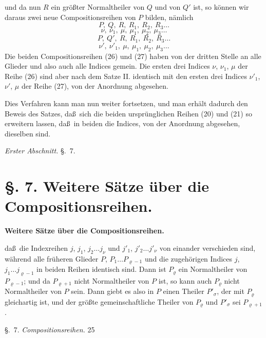 \documentclass[12pt,a4paper]{book}
\begin{document}
\vspace{0.3cm}

und da nun $R$ ein gr\"o\ss ter Normaltheiler von $Q$ und von $Q'$ ist, so k\"onnen wir daraus zwei neue Compositionsreihen von $P$ bilden, n\"amlich
\[P,\ Q,\ R,\ R_1,\ R_2,\ R_3 \ldots\]
\[\nu,\ \nu_1,\ \mu,\ \mu_1,\ \mu_2,\ \mu_3 \ldots\]
\[P,\ Q',\ R,\ R_1,\ R_2,\ R_3 \ldots\]
\[\nu',\ \nu'_1,\ \mu,\ \mu_1,\ \mu_2,\ \mu_3 \ldots\]
Die beiden Compositionsreihen (26) und (27) haben von der dritten Stelle an alle Glieder und also auch alle Indices gemein. Die ersten drei Indices $\nu$, $\nu_1$, $\mu$ der Reihe (26) sind aber nach dem Satze II. identisch mit den ersten drei Indices $\nu'_1$, $\nu'$, $\mu$ der Reihe (27), von der Anordnung abgesehen.

Dies Verfahren kann man nun weiter fortsetzen, und man erh\"alt dadurch den Beweis des Satzes, da\ss\ sich die beiden urspr\"unglichen Reihen (20) und (21) so erweitern lassen, da\ss\ in beiden die Indices, von der Anordnung abgesehen, dieselben sind.

\newpage
{} \hfill \textit{Erster Abschnitt.} \hfill \S.~7.

\vspace{0.3cm}

\section*{\S. 7. Weitere S\"atze \"uber die Compositionsreihen.}

\begin{center}
\textbf{Weitere S\"atze \"uber die Compositionsreihen.}
\end{center}

da\ss\ die Indexreihen $j$, $j_1$, $j_2 \ldots j_\nu$ und $j'_1$, $j'_2 \ldots j'_\nu$ von einander verschieden sind, w\"ahrend alle fr\"uheren Glieder $P$, $P_1 \ldots P_{\varrho-1}$ und die zugeh\"origen Indices $j$, $j_1 \ldots j_{\varrho-1}$ in beiden Reihen identisch sind. Dann ist $P_\varrho$ ein Normaltheiler von $P_{\varrho-1}$; und da $P_{\varrho+1}$ nicht Normaltheiler von $P$ ist, so kann auch $P_\varrho$ nicht Normaltheiler von $P$ sein. Dann giebt es also in $P$ einen Theiler $P'_\sigma$, der mit $P_\varrho$ gleichartig ist, und der gr\"o\ss te gemeinschaftliche Theiler von $P_\varrho$ und $P'_\sigma$ sei $P_{\varrho+1}$.

\newpage
\noindent\S.~7. \hfill \textit{Compositionsreihen.} \hfill 25
\end{document}
